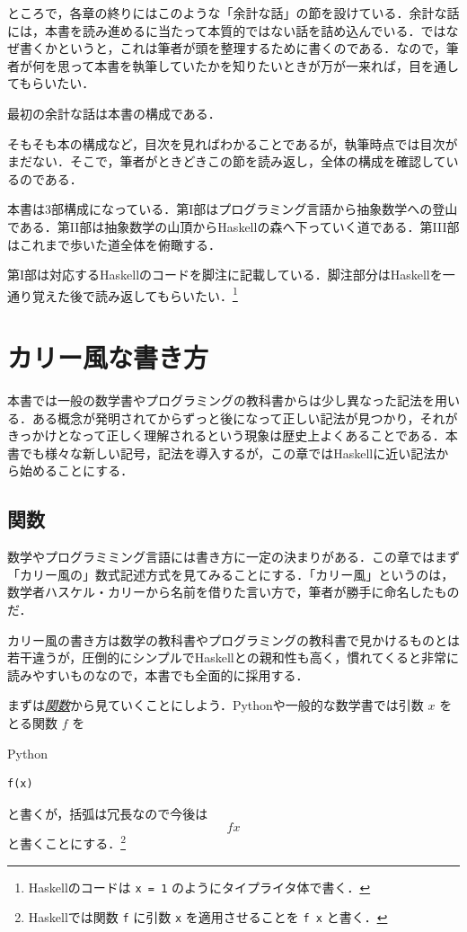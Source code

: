 \documentclass[a4paper]{jsbook}
\newcommand{\programminglanguage}[1]{\textsf{#1}}
\newcommand{\haskell}{\programminglanguage{Haskell}}
\newcommand{\python}{\programminglanguage{Python}}
\newenvironment{leader}{\begingroup}{\endgroup}
\newcommand{\keyword}[1]{{\underline{\emph{#1}}}}
\newcommand{\code}[1]{\texttt{#1}}
\newenvironment{pythoncode}{\begin{itembox}[r]{\python}}{\end{itembox}}
\begin{document}
ところで，各章の終りにはこのような「余計な話」の節を設けている．余計な話には，本書を読み進めるに当たって本質的ではない話を詰め込んでいる．ではなぜ書くかというと，これは筆者が頭を整理するために書くのである．なので，筆者が何を思って本書を執筆していたかを知りたいときが万が一来れば，目を通してもらいたい．

最初の余計な話は本書の構成である．

そもそも本の構成など，目次を見ればわかることであるが，執筆時点では目次がまだない．そこで，筆者がときどきこの節を読み返し，全体の構成を確認しているのである．

本書は3部構成になっている．第I部はプログラミング言語から抽象数学への登山である．第II部は抽象数学の山頂から\haskell の森へ下っていく道である．第III部はこれまで歩いた道全体を俯瞰する．

第I部は対応する\haskell のコードを脚注に記載している．脚注部分は\haskell を一通り覚えた後で読み返してもらいたい．\footnote{\haskell のコードは \code{x = 1} のようにタイプライタ体で書く．}

\chapter{カリー風な書き方}
\begin{leader}
本書では一般の数学書やプログラミングの教科書からは少し異なった記法を用いる．ある概念が発明されてからずっと後になって正しい記法が見つかり，それがきっかけとなって正しく理解されるという現象は歴史上よくあることである．本書でも様々な新しい記号，記法を導入するが，この章では\haskell に近い記法から始めることにする．
\end{leader}

\section{関数}

数学やプログラミミング言語には書き方に一定の決まりがある．この章ではまず「カリー風の」数式記述方式を見てみることにする．「カリー風」というのは，数学者ハスケル・カリーから名前を借りた言い方で，筆者が勝手に命名したものだ．

カリー風の書き方は数学の教科書やプログラミングの教科書で見かけるものとは若干違うが，圧倒的にシンプルで\haskell との親和性も高く，慣れてくると非常に読みやすいものなので，本書でも全面的に採用する．

まずは\keyword{関数}から見ていくことにしよう．\python や一般的な数学書では引数 $x$ をとる関数 $f$ を
\begin{pythoncode}
\begin{verbatim}
f(x)
\end{verbatim}
\end{pythoncode}
と書くが，括弧は冗長なので今後は
\begin{equation}
fx
\end{equation}
と書くことにする．\footnote{\haskell では関数 \code{f} に引数 \code{x} を適用させることを  \code{f x} と書く．}
\end{document}
